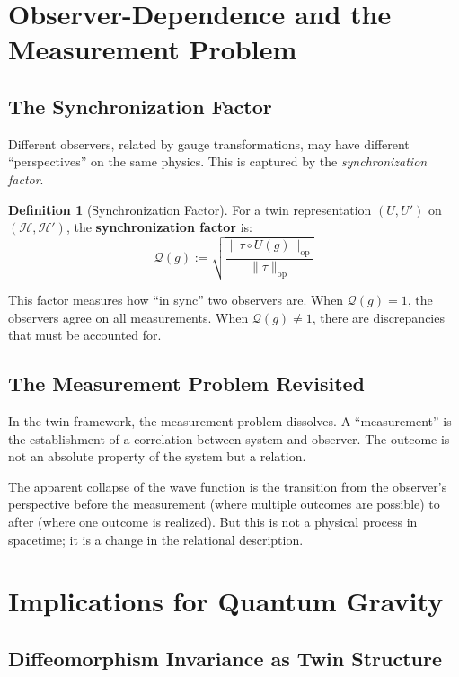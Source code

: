 \documentclass[11pt,a4paper,openright]{book}
\theoremstyle{plain}
\theoremstyle{definition}
\newtheorem{definition}[theorem]{Definition}
\newcommand{\Hil}{\mathcal{H}}
\newcommand{\op}{\mathrm{op}}
\begin{document}
\section{Observer-Dependence and the Measurement Problem}

\subsection{The Synchronization Factor}

Different observers, related by gauge transformations, may have different ``perspectives'' on the same physics. This is captured by the \emph{synchronization factor}.

\begin{definition}[Synchronization Factor]
For a twin representation $(U, U')$ on $(\Hil, \Hil')$, the \textbf{synchronization factor} is:
\begin{equation}
\mathcal{Q}(g) := \sqrt{\frac{\|\tau \circ U(g)\|_{\op}}{\|\tau\|_{\op}}}
\end{equation}
\end{definition}

This factor measures how ``in sync'' two observers are. When $\mathcal{Q}(g) = 1$, the observers agree on all measurements. When $\mathcal{Q}(g) \neq 1$, there are discrepancies that must be accounted for.

\subsection{The Measurement Problem Revisited}

In the twin framework, the measurement problem dissolves. A ``measurement'' is the establishment of a correlation between system and observer. The outcome is not an absolute property of the system but a relation.

The apparent collapse of the wave function is the transition from the observer's perspective before the measurement (where multiple outcomes are possible) to after (where one outcome is realized). But this is not a physical process in spacetime; it is a change in the relational description.

\section{Implications for Quantum Gravity}

\subsection{Diffeomorphism Invariance as Twin Structure}
\end{document}

